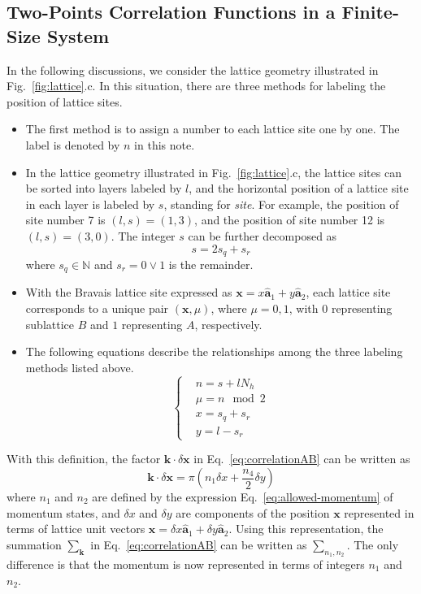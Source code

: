 \documentclass[12font]{article}
\numberwithin{equation}{section}    %
\theoremstyle{definition}
\newcommand{\lr}[1]{\left(  #1  \right)}
\newcommand{\bo}[1]{\mathbf{#1}}
\begin{document}
\subsection{Two-Points Correlation Functions in a Finite-Size System}
In the following discussions, we consider the lattice geometry illustrated in Fig.~\ref{fig:lattice}.c. In this situation, there are three methods for labeling the position of lattice sites. 
\begin{itemize}
    \item The first method is to assign a number to each lattice site one by one. The label is denoted by $n$ in this note.
    
    \item In the lattice geometry illustrated in Fig.~\ref{fig:lattice}.c, the lattice sites can be sorted into layers labeled by $l$, and the horizontal position of a lattice site in each layer is labeled by $s$, standing for \textit{site}. For example, the position of site number 7 is $(l,s) = (1,3)$, and the position of site number 12 is $(l,s) = (3,0)$. The integer $s$ can be further decomposed as
    \[
    s = 2 s_q + s_r
    \]
    where $s_q \in \mathbb{N}$ and $s_r = 0\vee 1$ is the remainder.

    \item With the Bravais lattice site expressed as $\bo{x} = x\hat{\bo{a}}_1 + y\hat{\bo{a}}_2$, each lattice site corresponds to a unique pair $(\bo{x},\mu)$, where $\mu = 0,1$, with $0$ representing sublattice $B$ and $1$ representing $A$, respectively.

    \item The following equations describe the relationships among the three labeling methods listed above.
    \[
    \left\{
    \begin{aligned}
        & n = s + lN_h \\
        & \mu = n \mod{2}\\
        & x = s_q + s_r \\
        & y = l - s_r
    \end{aligned}
    \right.
    \]
\end{itemize}
With this definition, the factor $\bo{k}\cdot\delta\bo{x}$ in Eq.~\eqref{eq:correlationAB} can be written as
\[
\bo{k}\cdot\delta\bo{x} = \pi \lr{n_1\delta x + \frac{n_4}{2}\delta y}
\]
where $n_1$ and $n_2$ are defined by the expression Eq.~\eqref{eq:allowed-momentum} of momentum states, and $\delta x$ and $\delta y$ are components of the position $\bo{x}$ represented in terms of lattice unit vectors $\bo{x} = \delta x \hat{\bo{a}}_1 + \delta y\hat{\bo{a}}_2$. Using this representation, the summation $\sum_{\bo{k}}$ in Eq.~\eqref{eq:correlationAB} can be written as $\sum_{n_1,n_2}$. The only difference is that the momentum is now represented in terms of integers $n_1$ and $n_2$.
\end{document}
